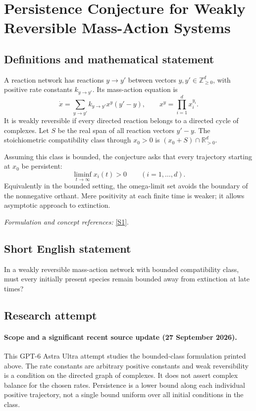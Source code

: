 \documentclass[11pt]{article}
\begin{document}
\section*{\texorpdfstring{Persistence Conjecture for Weakly Reversible Mass-Action Systems}{Persistence Conjecture for Weakly Reversible Mass-Action Systems}}\label{statement}
\subsection{Definitions and mathematical statement}
A reaction network has reactions $y\to y'$ between vectors $y,y'\in{\mathbb{Z}}_{\ge0}^d$, with positive rate constants $k_{y\to y'}$. Its mass-action equation is
\[
 \dot x=\sum_{y\to y'}k_{y\to y'}x^y(y'-y),
 \qquad x^y=\prod_{i=1}^dx_i^{y_i}.
\]
It is weakly reversible if every directed reaction belongs to a directed cycle of complexes. Let $S$ be the real span of all reaction vectors $y'-y$. The stoichiometric compatibility class through $x_0>0$ is $(x_0+S)\cap{\mathbb{R}}_{>0}^d$.

Assuming this class is bounded, the conjecture asks that every trajectory starting at $x_0$ be persistent:
\[
 \liminf_{t\to\infty}x_i(t)>0\qquad(i=1,\ldots,d).
\]
Equivalently in the bounded setting, the omega-limit set avoids the boundary of the nonnegative orthant. Mere positivity at each finite time is weaker; it allows asymptotic approach to extinction.
\par\smallskip\textit{Formulation and concept references:} \href{https://reaction-networks.net/wiki/Persistence_and_the_Global_Attractor_Conjecture}{[S1]}.

\subsection{Short English statement}
In a weakly reversible mass-action network with bounded compatibility class, must every initially present species remain bounded away from extinction at late times?
\subsection{Research attempt}

\paragraph{Scope and a significant recent source update (27 September 2026).}
This GPT-6 Astra Ultra attempt studies the bounded-class formulation
printed above. The rate constants are arbitrary positive constants and
weak reversibility is a condition on the directed graph of complexes.
It does not assert complex balance for the chosen rates. Persistence is
a lower bound along each individual positive trajectory, not a single
bound uniform over all initial conditions in the class.
\end{document}
